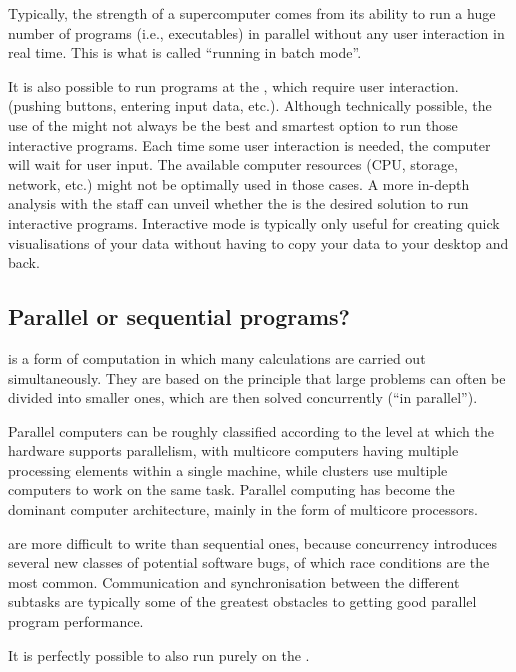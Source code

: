 Typically, the strength of a supercomputer comes from its ability to run a huge
number of programs (i.e., executables) in parallel without any user interaction
in real time. This is what is called ``running in batch mode''.

It is also possible to run programs at the \hpc, which require user
interaction. (pushing buttons, entering input data, etc.).  Although
technically possible, the use of the \hpc might not always be the best and
smartest option to run those interactive programs.  Each time some user
interaction is needed, the computer will wait for user input. The available
computer resources (CPU, storage, network, etc.) might not be optimally used in
those cases. A more in-depth analysis with the \hpc staff can unveil whether
the \hpc is the desired solution to run interactive programs.
Interactive mode is typically only useful for creating quick visualisations
of your data without having to copy your data to your desktop and back.

\subsection{Parallel or sequential programs?}
\label{sec:parallel-or-sequential-programs}

 is a form of computation in which many calculations
are carried out simultaneously. They are based on the principle that large
problems can often be divided into smaller ones, which are then solved
concurrently (``in parallel'').

Parallel computers can be roughly classified according to the level at which
the hardware supports parallelism, with multicore computers having multiple
processing elements within a single machine, while clusters use multiple
computers to work on the same task. Parallel computing has become the dominant
computer architecture, mainly in the form of multicore processors.

 are more difficult to write than sequential ones,
because concurrency introduces several new classes of potential software bugs,
of which race conditions are the most common. Communication and synchronisation
between the different subtasks are typically some of the greatest obstacles to
getting good parallel program performance.

It is perfectly possible to also run purely  on the
\hpc.

